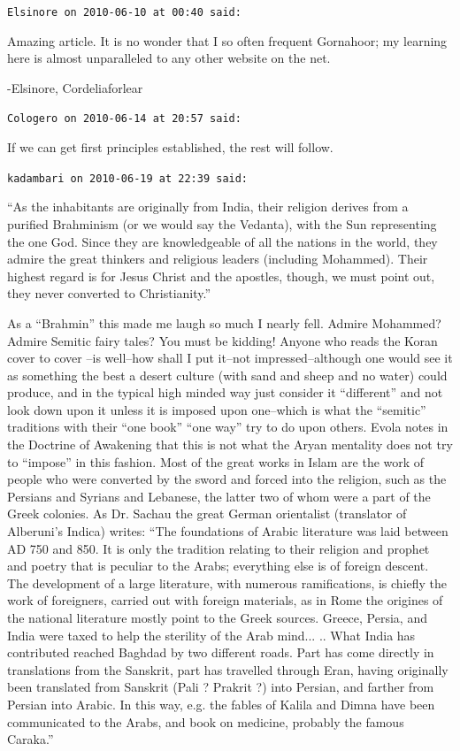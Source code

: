 \begin{footnotesize}
\begin{sffamily}
\texttt{Elsinore on 2010-06-10 at 00:40 said:}

Amazing article. It is no wonder that I so often frequent Gornahoor; my learning here is almost unparalleled to any other website on the net.

-Elsinore, Cordeliaforlear

\hfill

\texttt{Cologero on 2010-06-14 at 20:57 said:}

If we can get first principles established, the rest will follow.

\hfill

\texttt{kadambari on 2010-06-19 at 22:39 said:}

``As the inhabitants are originally from India, their religion derives from a purified Brahminism (or we would say the Vedanta), with the Sun representing the one God. Since they are knowledgeable of all the nations in the world, they admire the great thinkers and religious leaders (including Mohammed). Their highest regard is for Jesus Christ and the apostles, though, we must point out, they never converted to Christianity.''

As a ``Brahmin'' this made me laugh so much I nearly fell. Admire Mohammed? Admire Semitic fairy tales? You must be kidding! Anyone who reads the Koran cover to cover --is well--how shall I put it--not impressed--although one would see it as something the best a desert culture (with sand and sheep and no water) could produce, and in the typical high minded way just consider it ``different'' and not look down upon it unless it is imposed upon one--which is what the ``semitic'' traditions with their ``one book'' ``one way'' try to do upon others. Evola notes in the Doctrine of Awakening that this is not what the Aryan mentality does not try to ``impose'' in this fashion. Most of the great works in Islam are the work of people who were converted by the sword and forced into the religion, such as the Persians and Syrians and Lebanese, the latter two of whom were a part of the Greek colonies. As Dr. Sachau the great German orientalist (translator of Alberuni's Indica) writes: ``The foundations of Arabic literature was laid between AD 750 and 850. It is only the tradition relating to their religion and prophet and poetry that is peculiar to the Arabs; everything else is of foreign descent. The development of a large literature, with numerous ramifications, is chiefly the work of foreigners, carried out with foreign materials, as in Rome the origines of the national literature mostly point to the Greek sources. Greece, Persia, and India were taxed to help the sterility of the Arab mind... .. What India has contributed reached Baghdad by two different roads. Part has come directly in translations from the Sanskrit, part has travelled through Eran, having originally been translated from Sanskrit (Pali ? Prakrit ?) into Persian, and farther from Persian into Arabic. In this way, e.g. the fables of Kalila and Dimna have been communicated to the Arabs, and book on medicine, probably the famous Caraka.''


\end{sffamily}
\end{footnotesize}

